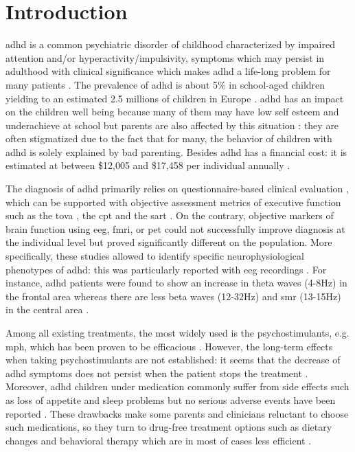 

\section{Introduction} 

\gls{adhd} is a common psychiatric disorder of childhood characterized by impaired attention and/or hyperactivity/impulsivity, 
symptoms which may persist in adulthood with clinical significance which makes \gls{adhd} a life-long problem for many patients 
\citep{Faraone2006}. The prevalence of \gls{adhd} is about 5\% in school-aged children yielding to an estimated 2.5 millions of 
children in Europe \citep{DSM-5}. \gls{adhd} has an impact on the children well being because many of them may have low self 
esteem \citep{Shaw2005} and underachieve at school \citep{Barry2002} but parents are also affected by this situation \citep{Harpin2005}: 
they are often stigmatized due to the fact that for many, the behavior of children with \gls{adhd} is solely explained by bad 
parenting. Besides \gls{adhd} has a financial cost: it is estimated at between \$12,005 and \$17,458 per individual annually \citep{Pelham2007}. 

The diagnosis of \gls{adhd} primarily relies on questionnaire-based clinical evaluation \citep{DSM-5}, which can be supported 
with objective assessment metrics of executive function such as the \gls{tova} \citep{Forbes1998}, the \gls{cpt} \citep{Barkley1991} 
and the \gls{sart} \citep{Robertson1997}. On the contrary, objective markers of brain function using \gls{eeg}, \gls{fmri}, or \gls{pet}
could not successfully improve diagnosis \citep{Neba} at the individual level but proved significantly different on the 
population. More specifically, these studies allowed to identify specific neurophysiological phenotypes of \gls{adhd}: 
this was particularly reported with \gls{eeg} recordings \citep{loo2017}. For instance, \gls{adhd} patients were found to show 
an increase in theta waves (4-8Hz) in the frontal area whereas there are less beta waves (12-32Hz) and \gls{smr} (13-15Hz) 
in the central area \citep{Monastra2005, Matouvsek1984, Janzen1995}.  
 
Among all existing treatments, the most widely used is the psychostimulants, e.g. \gls{mph}, which has been proven to be 
efficacious \citep{Taylor2014, Storebo2015}. However, the long-term effects when taking psychostimulants
are not established: it seems that the decrease of \gls{adhd} symptoms does not persist when the patient stops the treatment
\citep{DuPaul1998, Swanson2001, Jensen1999}. Moreover, \gls{adhd} children under medication commonly suffer from side effects
such as loss of appetite and sleep problems but no serious adverse events have been reported \citep{Storebo2015, Cooper2011}. 
These drawbacks make some parents and clinicians reluctant to choose such medications, so they turn to drug-free
treatment options such as dietary changes \citep{Belanger2009} and behavioral therapy which are in most of cases less efficient \citep{Sonuga-Barke2013}.

